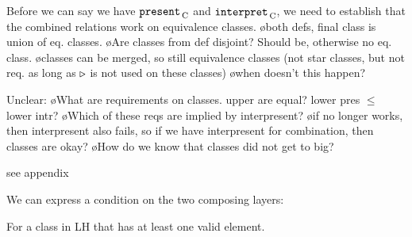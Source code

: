 %
%

%


\bc



Before we can say we have ${\tt present}_{\, \mathrm C}$ and ${\tt interpret}_{\, \mathrm C}$, we need to establish that the combined relations work on equivalence classes.
\bl
\o both defs, final class is union of eq. classes. 
\o Are classes from def disjoint? Should be, otherwise no eq. class. 
\o classes can be merged, so still equivalence classes (not star classes, but not req. as long as $\triangleright$ is not used on these classes)
\o when doesn't this happen?
\el

Unclear:
\bl
\o What are requirements on classes. upper are equal? lower pres $\leq$ lower intr?
\o Which of these reqs are implied by interpresent?
\o if no longer works, then interpresent also fails, so if we have interpresent for combination, then classes are okay? 
\o How do we know that classes did not get to big?
\el

see appendix
\ec

We can express a condition on the two composing layers:


For a class in LH that has at least one valid element.








